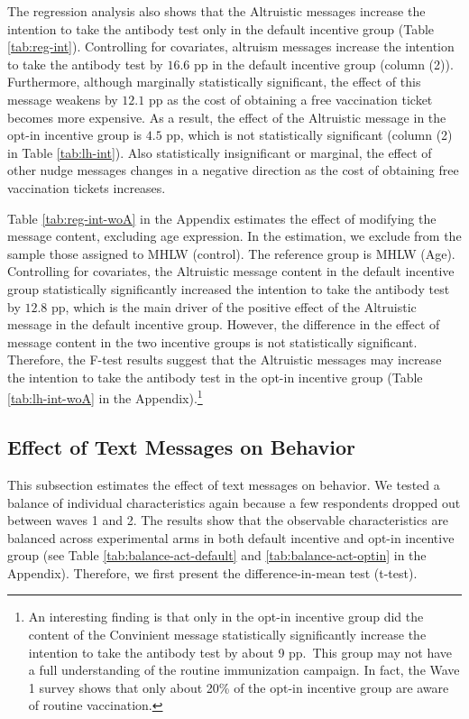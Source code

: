 \documentclass[
]{article}
\begin{document}
The regression analysis also shows that the Altruistic messages increase the intention to take the antibody test only in the default incentive group (Table \ref{tab:reg-int}). Controlling for covariates, altruism messages increase the intention to take the antibody test by \(16.6\) pp in the default incentive group (column (2)). Furthermore, although marginally statistically significant, the effect of this message weakens by \(12.1\) pp as the cost of obtaining a free vaccination ticket becomes more expensive. As a result, the effect of the Altruistic message in the opt-in incentive group is \(4.5\) pp, which is not statistically significant (column (2) in Table \ref{tab:lh-int}). Also statistically insignificant or marginal, the effect of other nudge messages changes in a negative direction as the cost of obtaining free vaccination tickets increases.

Table \ref{tab:reg-int-woA} in the Appendix estimates the effect of modifying the message content, excluding age expression. In the estimation, we exclude from the sample those assigned to MHLW (control). The reference group is MHLW (Age). Controlling for covariates, the Altruistic message content in the default incentive group statistically significantly increased the intention to take the antibody test by \(12.8\) pp, which is the main driver of the positive effect of the Altruistic message in the default incentive group. However, the difference in the effect of message content in the two incentive groups is not statistically significant. Therefore, the F-test results suggest that the Altruistic messages may increase the intention to take the antibody test in the opt-in incentive group (Table \ref{tab:lh-int-woA} in the Appendix).\footnote{An interesting finding is that only in the opt-in incentive group did the content of the Convinient message statistically significantly increase the intention to take the antibody test by about 9 pp.~This group may not have a full understanding of the routine immunization campaign. In fact, the Wave 1 survey shows that only about 20\% of the opt-in incentive group are aware of routine vaccination.}

\hypertarget{behavior}{%
\subsection{Effect of Text Messages on Behavior}\label{behavior}}

This subsection estimates the effect of text messages on behavior. We tested a balance of individual characteristics again because a few respondents dropped out between waves 1 and 2. The results show that the observable characteristics are balanced across experimental arms in both default incentive and opt-in incentive group (see Table \ref{tab:balance-act-default} and \ref{tab:balance-act-optin} in the Appendix). Therefore, we first present the difference-in-mean test (t-test).
\end{document}

